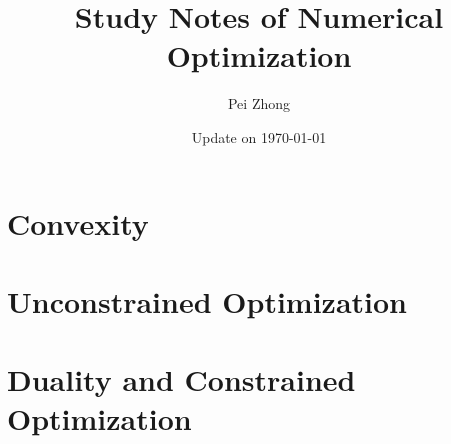 \documentclass[12pt,oneside]{book} %
\begin{document}
\title{\bf \huge Study Notes of Numerical Optimization}
\author{Pei Zhong}
\date{Update on \today}

\maketitle


\tableofcontents

\begin{spacing}{1}







\part{Convexity}





\part{Unconstrained Optimization}














\part{Duality and Constrained Optimization}










\end{spacing}
\end{document}
